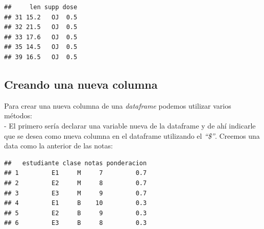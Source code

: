 \documentclass[
]{book}
\newenvironment{Shaded}{\begin{snugshade}}{\end{snugshade}}
\newcommand{\AttributeTok}[1]{\textcolor[rgb]{0.13,0.29,0.53}{#1}}
\newcommand{\DecValTok}[1]{\textcolor[rgb]{0.00,0.00,0.81}{#1}}
\newcommand{\FloatTok}[1]{\textcolor[rgb]{0.00,0.00,0.81}{#1}}
\newcommand{\FunctionTok}[1]{\textcolor[rgb]{0.13,0.29,0.53}{\textbf{#1}}}
\newcommand{\NormalTok}[1]{#1}
\newcommand{\OtherTok}[1]{\textcolor[rgb]{0.56,0.35,0.01}{#1}}
\newcommand{\SpecialCharTok}[1]{\textcolor[rgb]{0.81,0.36,0.00}{\textbf{#1}}}
\newcommand{\StringTok}[1]{\textcolor[rgb]{0.31,0.60,0.02}{#1}}
\begin{document}
\begin{verbatim}
##     len supp dose
## 31 15.2   OJ  0.5
## 32 21.5   OJ  0.5
## 33 17.6   OJ  0.5
## 35 14.5   OJ  0.5
## 39 16.5   OJ  0.5
\end{verbatim}

\hfill\break

\subsection{Creando una nueva columna}\label{creando-una-nueva-columna}

Para crear una nueva columna de una \emph{dataframe} podemos utilizar varios métodos:\\
- El primero sería declarar una variable nueva de la dataframe y de ahí indicarle que se desea como nueva columna en el dataframe utilizando el \emph{``\$''}. Creemos una data como la anterior de las notas:

\begin{Shaded}
\end{Shaded}

\begin{verbatim}
##   estudiante clase notas ponderacion
## 1         E1     M     7         0.7
## 2         E2     M     8         0.7
## 3         E3     M     9         0.7
## 4         E1     B    10         0.3
## 5         E2     B     9         0.3
## 6         E3     B     8         0.3
\end{verbatim}
\end{document}
